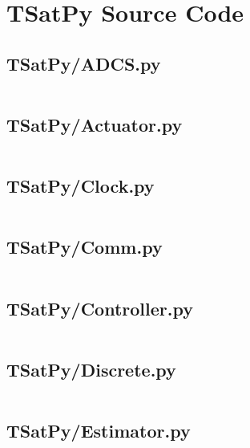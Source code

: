 
\chapter{TSatPy Source Code}
\label{chap:tsatpy_source}

\linespread{1}

\pagebreak
\section*{TSatPy/ADCS.py}\label{code:TSatPy/ADCS.py}\inputminted[linenos,fontsize=\scriptsize]{python}{/home/dcouture/git/mathyourlife/TSatPy/TSatPy/ADCS.py}

\pagebreak
\section*{TSatPy/Actuator.py}\label{code:TSatPy/Actuator.py}\inputminted[linenos,fontsize=\scriptsize]{python}{/home/dcouture/git/mathyourlife/TSatPy/TSatPy/Actuator.py}

\pagebreak
\section*{TSatPy/Clock.py}\label{code:TSatPy/Clock.py}\inputminted[linenos,fontsize=\scriptsize]{python}{/home/dcouture/git/mathyourlife/TSatPy/TSatPy/Clock.py}

\pagebreak
\section*{TSatPy/Comm.py}\label{code:TSatPy/Comm.py}\inputminted[linenos,fontsize=\scriptsize]{python}{/home/dcouture/git/mathyourlife/TSatPy/TSatPy/Comm.py}

\pagebreak
\section*{TSatPy/Controller.py}\label{code:TSatPy/Controller.py}\inputminted[linenos,fontsize=\scriptsize]{python}{/home/dcouture/git/mathyourlife/TSatPy/TSatPy/Controller.py}

\pagebreak
\section*{TSatPy/Discrete.py}\label{code:TSatPy/Discrete.py}\inputminted[linenos,fontsize=\scriptsize]{python}{/home/dcouture/git/mathyourlife/TSatPy/TSatPy/Discrete.py}

\pagebreak
\section*{TSatPy/Estimator.py}\label{code:TSatPy/Estimator.py}\inputminted[linenos,fontsize=\scriptsize]{python}{/home/dcouture/git/mathyourlife/TSatPy/TSatPy/Estimator.py}

